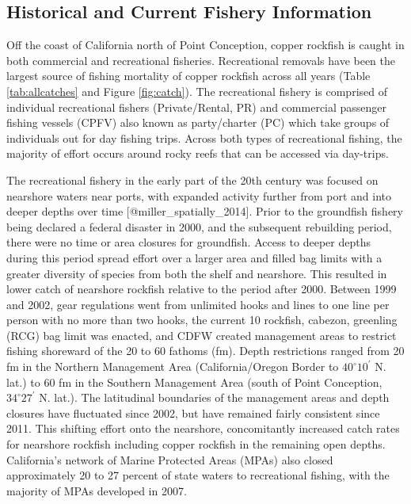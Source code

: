 \documentclass[11pt,
  letterpaper,
]{article}
\begin{document}
\subsection{Historical and Current Fishery Information}\label{historical-and-current-fishery-information}

Off the coast of California north of Point Conception, copper rockfish is caught in both commercial and recreational fisheries. Recreational removals have been the largest source of fishing mortality of copper rockfish across all years (Table \ref{tab:allcatches} and Figure \ref{fig:catch}). The recreational fishery is comprised of individual recreational fishers (Private/Rental, PR) and commercial passenger fishing vessels (CPFV) also known as party/charter (PC) which take groups of individuals out for day fishing trips. Across both types of recreational fishing, the majority of effort occurs around rocky reefs that can be accessed via day-trips.

The recreational fishery in the early part of the 20th century was focused on nearshore waters near ports, with expanded activity further from port and into deeper depths over time {[}@miller\_spatially\_2014{]}. Prior to the groundfish fishery being declared a federal disaster in 2000, and the subsequent rebuilding period, there were no time or area closures for groundfish. Access to deeper depths during this period spread effort over a larger area and filled bag limits with a greater diversity of species from both the shelf and nearshore. This resulted in lower catch of nearshore rockfish relative to the period after 2000. Between 1999 and 2002, gear regulations went from unlimited hooks and lines to one line per person with no more than two hooks, the current 10 rockfish, cabezon, greenling (RCG) bag limit was enacted, and CDFW created management areas to restrict fishing shoreward of the 20 to 60 fathoms (fm). Depth restrictions ranged from 20 fm in the Northern Management Area (California/Oregon Border to $40^\circ 10^\prime$ N. lat.) to 60 fm in the Southern Management Area (south of Point Conception, $34^\circ 27^\prime$ N. lat.). The latitudinal boundaries of the management areas and depth closures have fluctuated since 2002, but have remained fairly consistent since 2011. This shifting effort onto the nearshore, concomitantly increased catch rates for nearshore rockfish including copper rockfish in the remaining open depths. California's network of Marine Protected Areas (MPAs) also closed approximately 20 to 27 percent of state waters to recreational fishing, with the majority of MPAs developed in 2007.
\end{document}
